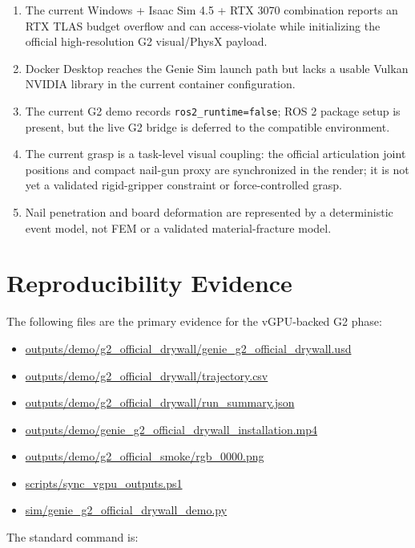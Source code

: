 \documentclass[11pt,a4paper]{article}
\begin{document}
\begin{enumerate}[leftmargin=2em]
  \item The current Windows + Isaac Sim 4.5 + RTX 3070 combination reports an RTX
        TLAS budget overflow and can access-violate while initializing the official
        high-resolution G2 visual/PhysX payload.
  \item Docker Desktop reaches the Genie Sim launch path but lacks a usable Vulkan
        NVIDIA library in the current container configuration.
  \item The current G2 demo records \texttt{ros2\_runtime=false}; ROS 2 package setup
        is present, but the live G2 bridge is deferred to the compatible environment.
  \item The current grasp is a task-level visual coupling: the official articulation
        joint positions and compact nail-gun proxy are synchronized in the render;
        it is not yet a validated rigid-gripper constraint or force-controlled grasp.
  \item Nail penetration and board deformation are represented by a deterministic
        event model, not FEM or a validated material-fracture model.
\end{enumerate}

\section{Reproducibility Evidence}

The following files are the primary evidence for the vGPU-backed G2 phase:

\begin{itemize}[leftmargin=2em]
  \item \url{outputs/demo/g2_official_drywall/genie_g2_official_drywall.usd}
  \item \url{outputs/demo/g2_official_drywall/trajectory.csv}
  \item \url{outputs/demo/g2_official_drywall/run_summary.json}
  \item \url{outputs/demo/genie_g2_official_drywall_installation.mp4}
  \item \url{outputs/demo/g2_official_smoke/rgb_0000.png}
  \item \url{scripts/sync_vgpu_outputs.ps1}
  \item \url{sim/genie_g2_official_drywall_demo.py}
\end{itemize}

The standard command is:
\end{document}
